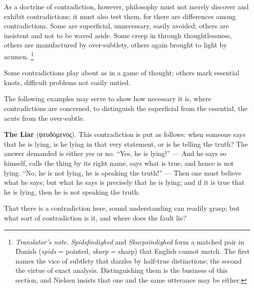 \documentclass[12pt,a4paper]{book}
\renewcommand{\thefootnote}{\ifcase\value{footnote}\or *)\or **)\or ***)\fi}
\newcommand{\tnote}[1]{%
  \begingroup
  \renewcommand{\thefootnote}{\textdagger}%
  \footnote{\emph{Translator's note.} #1}%
  \addtocounter{footnote}{-1}%
  \endgroup}
\begin{document}
As a doctrine of contradiction, however, philosophy must not merely discover
and exhibit contradictions; it must also test them, for there are differences
among contradictions. Some are superficial, unnecessary, easily avoided; others
are insistent and not to be waved aside. Some creep in through thoughtlessness,
others
are manufactured by over-subtlety, others again brought to light by
acumen.\tnote{\emph{Spidsfindighed} and \emph{Skarpsindighed} form a matched
pair in Danish (\emph{spids} = pointed, \emph{skarp} = sharp) that English
cannot match. The first names the vice of subtlety that dazzles by
half-true distinctions; the second the virtue of exact analysis. Distinguishing
them is the business of this section, and Nielsen insists that one and the same
utterance may be either.} Some contradictions play about as in a game of
thought; others mark essential knots, difficult problems not easily untied.

The following examples may serve to show how necessary it is, where
contradictions are concerned, to distinguish the superficial from the
essential, the acute from the over-subtle.

\textbf{The Liar} (ψευδόμενος). This contradiction is put as follows: when
someone says that he is lying, is he lying in that very statement, or is he
telling the truth? The answer demanded is either yes or no. ``Yes, he is
lying!'' --- And he says so himself, calls the thing by its right name, says
what is true, and hence is not lying. ``No, he is not lying, he is speaking the
truth!'' --- Then one must believe what he says; but what he says is precisely
that he is lying; and if it is true that he is lying, then he is not speaking
the truth.

That there is a contradiction here, sound understanding can readily grasp; but
what sort of contradiction is it, and where does the fault lie?
\end{document}
